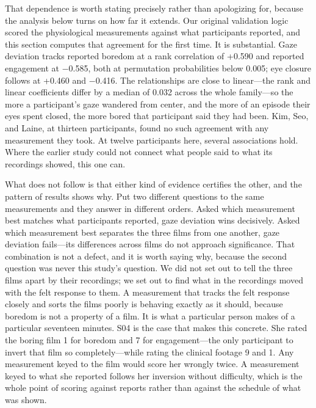 That dependence is worth stating precisely rather than apologizing for, because the analysis
below turns on how far it extends. Our original validation logic scored the physiological
measurements against what participants reported, and this section computes that agreement for
the first time. It is substantial. Gaze deviation tracks reported boredom at a rank correlation
of +0.590 and reported engagement at $-$0.585, both at permutation probabilities below 0.005;
eye closure follows at +0.460 and $-$0.416. The relationships are close to linear---the rank and
linear coefficients differ by a median of 0.032 across the whole family---so the more a
participant's gaze wandered from center, and the more of an episode their eyes spent closed, the
more bored that participant said they had been. Kim, Seo, and Laine, at thirteen participants,
found no such agreement with any measurement they took. At twelve participants here, several
associations hold. Where the earlier study could not connect what people said to what its
recordings showed, this one can.

What does not follow is that either kind of evidence certifies the other, and the pattern of
results shows why. Put two different questions to the same measurements and they answer in
different orders. Asked which measurement best matches what participants reported, gaze
deviation wins decisively. Asked which measurement best separates the three films from one
another, gaze deviation fails---its differences across films do not approach significance.
That combination is not a defect, and it is worth saying why, because the second question was
never this study's question. We did not set out to tell the three films apart by their
recordings; we set out to find what in the recordings moved with the felt response to them. A
measurement that tracks the felt response closely and sorts the films poorly is behaving
exactly as it should, because boredom is not a property of a film. It is what a particular
person makes of a particular seventeen minutes. S04 is the case that makes this concrete. She
rated the boring film 1 for boredom and 7 for engagement---the only participant to invert that
film so completely---while rating the clinical footage 9 and 1. Any measurement keyed to the
film would score her wrongly twice. A measurement keyed to what she reported follows her
inversion without difficulty, which is the whole point of scoring against reports rather than
against the schedule of what was shown.

